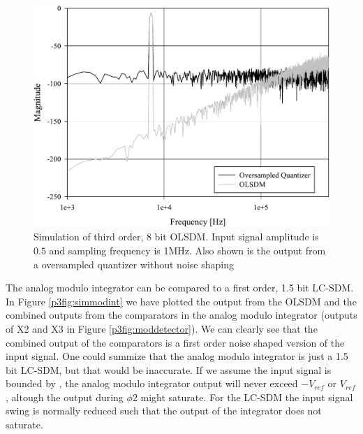 \begin{figure}[ht]
\centering 
 \includegraphics[width=\myfigwidth]{graphics/simolsd}
  \caption{Simulation of third order, 8 bit OLSDM. Input signal
  amplitude is $0.5$ and sampling frequency is 1MHz. Also shown is the
  output from a oversampled quantizer without noise shaping }
  \label{p3fig:simolsd}
\end{figure}

The analog modulo integrator can be compared to a first
order, 1.5 bit LC-SDM. In Figure \ref{p3fig:simmodint} we have
plotted the output from the OLSDM  and the combined outputs from the
comparators in the analog modulo integrator (outputs of X2 and X3 in
Figure \ref{p3fig:moddetector}). We
can clearly see that the combined output of the comparators is a first order
noise shaped version of the input signal. One could summize
that the analog modulo integrator is just a 1.5 bit LC-SDM, but that
would be inaccurate. If we assume the input signal is bounded by
, the analog modulo integrator output will never
exceed $-V_{ref}$ or  $V_{ref}$, altough the output during $\phi2$
might saturate. For the LC-SDM the input signal swing is
normally reduced such that the output of the integrator does not
saturate.

